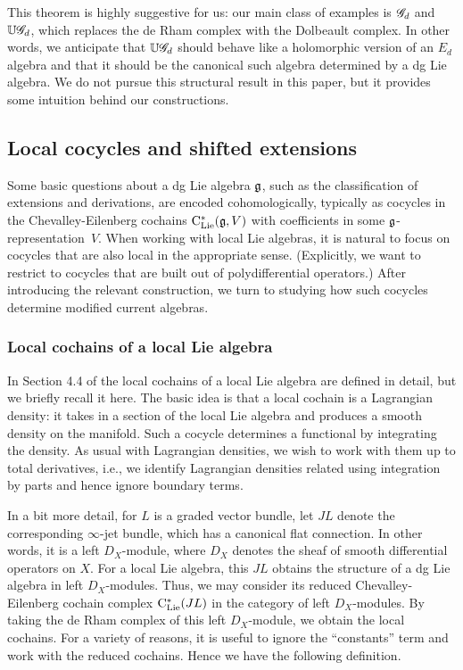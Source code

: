 This theorem is highly suggestive for us:
our main class of examples is $\mathscr G_d$ and $\mathbb U \mathscr G_d$,
which replaces the de Rham complex with the Dolbeault complex.
In other words, we anticipate that $\mathbb U \mathscr G_d$ should behave like a holomorphic version of an $E_d$ algebra
and that it should be the canonical such algebra determined by a dg Lie algebra.
We do not pursue this structural result in this paper,
but it provides some intuition behind our constructions.

\subsection{Local cocycles and shifted extensions}
\label{sec: localcocycle}

Some basic questions about a dg Lie algebra $\mathfrak g$, such as the classification of extensions and derivations, are encoded cohomologically, typically as cocycles in the Chevalley-Eilenberg cochains ${\rm C}_{\rm Lie}^*(\mathfrak g,V)$ with coefficients in some $\mathfrak g$-representation~$V$.
When working with local Lie algebras, it is natural to focus on cocycles that are also local in the appropriate sense.
(Explicitly, we want to restrict to cocycles that are built out of polydifferential operators.)
After introducing the relevant construction, we turn to studying how such cocycles determine modified current algebras.

\subsubsection{Local cochains of a local Lie algebra}
\label{sec:cloc}

In Section 4.4 of \cite{CG2} the local cochains of a local Lie algebra are defined in detail, 
but we briefly recall it here.
The basic idea is that a local cochain is a Lagrangian density: 
it takes in a section of the local Lie algebra and produces a smooth density on the manifold. 
Such a cocycle determines a functional by integrating the density.
As usual with Lagrangian densities, we wish to work with them up to total derivatives,
i.e., we identify Lagrangian densities related using integration by parts and hence ignore boundary terms.

In a bit more detail, for $L$ is a graded vector bundle, let $JL$ denote the corresponding $\infty$-jet bundle,
which has a canonical flat connection.
In other words, it is a left $D_X$-module, where $D_X$ denotes the sheaf of smooth differential operators on $X$.
For a local Lie algebra, this $JL$ obtains the structure of a dg Lie algebra in left $D_X$-modules.
Thus, we may consider its reduced Chevalley-Eilenberg cochain complex ${\rm C}_{\rm Lie}^*(JL)$ in the category of left $D_X$-modules. 
By taking the de Rham complex of this left $D_X$-module, we obtain the local cochains.
For a variety of reasons, it is useful to ignore the ``constants'' term and work with the reduced cochains.
Hence we have the following definition.

